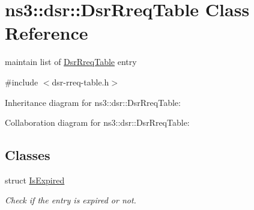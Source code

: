 \hypertarget{classns3_1_1dsr_1_1DsrRreqTable}{}\section{ns3\+:\+:dsr\+:\+:Dsr\+Rreq\+Table Class Reference}
\label{classns3_1_1dsr_1_1DsrRreqTable}


maintain list of \hyperlink{classns3_1_1dsr_1_1DsrRreqTable}{Dsr\+Rreq\+Table} entry  




{\ttfamily \#include $<$dsr-\/rreq-\/table.\+h$>$}



Inheritance diagram for ns3\+:\+:dsr\+:\+:Dsr\+Rreq\+Table\+:


Collaboration diagram for ns3\+:\+:dsr\+:\+:Dsr\+Rreq\+Table\+:
\subsection*{Classes}
\begin{DoxyCompactItemize}
\item 
struct \hyperlink{structns3_1_1dsr_1_1DsrRreqTable_1_1IsExpired}{Is\+Expired}
\begin{DoxyCompactList}\small\item\em Check if the entry is expired or not. \end{DoxyCompactList}\end{DoxyCompactItemize}
